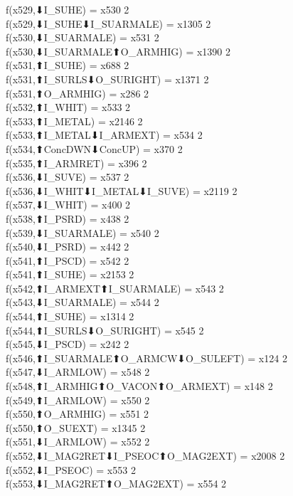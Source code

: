 f(x529,⬇I_SUHE) = x530 {2} \\
f(x529,⬇I_SUHE⬇I_SUARMALE) = x1305 {2} \\
f(x530,⬇I_SUARMALE) = x531 {2} \\
f(x530,⬇I_SUARMALE⬆O_ARMHIG) = x1390 {2} \\
f(x531,⬆I_SUHE) = x688 {2} \\
f(x531,⬆I_SURLS⬇O_SURIGHT) = x1371 {2} \\
f(x531,⬆O_ARMHIG) = x286 {2} \\
f(x532,⬆I_WHIT) = x533 {2} \\
f(x533,⬆I_METAL) = x2146 {2} \\
f(x533,⬆I_METAL⬇I_ARMEXT) = x534 {2} \\
f(x534,⬆ConcDWN⬇ConcUP) = x370 {2} \\
f(x535,⬆I_ARMRET) = x396 {2} \\
f(x536,⬇I_SUVE) = x537 {2} \\
f(x536,⬇I_WHIT⬇I_METAL⬇I_SUVE) = x2119 {2} \\
f(x537,⬇I_WHIT) = x400 {2} \\
f(x538,⬆I_PSRD) = x438 {2} \\
f(x539,⬇I_SUARMALE) = x540 {2} \\
f(x540,⬇I_PSRD) = x442 {2} \\
f(x541,⬆I_PSCD) = x542 {2} \\
f(x541,⬆I_SUHE) = x2153 {2} \\
f(x542,⬆I_ARMEXT⬆I_SUARMALE) = x543 {2} \\
f(x543,⬇I_SUARMALE) = x544 {2} \\
f(x544,⬆I_SUHE) = x1314 {2} \\
f(x544,⬆I_SURLS⬇O_SURIGHT) = x545 {2} \\
f(x545,⬇I_PSCD) = x242 {2} \\
f(x546,⬆I_SUARMALE⬆O_ARMCW⬇O_SULEFT) = x124 {2} \\
f(x547,⬇I_ARMLOW) = x548 {2} \\
f(x548,⬆I_ARMHIG⬆O_VACON⬆O_ARMEXT) = x148 {2} \\
f(x549,⬆I_ARMLOW) = x550 {2} \\
f(x550,⬆O_ARMHIG) = x551 {2} \\
f(x550,⬆O_SUEXT) = x1345 {2} \\
f(x551,⬇I_ARMLOW) = x552 {2} \\
f(x552,⬇I_MAG2RET⬇I_PSEOC⬆O_MAG2EXT) = x2008 {2} \\
f(x552,⬇I_PSEOC) = x553 {2} \\
f(x553,⬇I_MAG2RET⬆O_MAG2EXT) = x554 {2} \\
